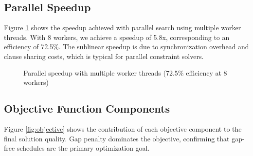 \documentclass[12pt,a4paper]{article}
\begin{document}
\subsection{Parallel Speedup}

Figure \ref{fig:parallel} shows the speedup achieved with parallel search using multiple worker threads. With 8 workers, we achieve a speedup of 5.8x, corresponding to an efficiency of 72.5\%. The sublinear speedup is due to synchronization overhead and clause sharing costs, which is typical for parallel constraint solvers.

\begin{figure}[H]
\centering
{}
\caption{Parallel speedup with multiple worker threads (72.5\% efficiency at 8 workers)}
\label{fig:parallel}
\end{figure}

\subsection{Objective Function Components}

Figure \ref{fig:objective} shows the contribution of each objective component to the final solution quality. Gap penalty dominates the objective, confirming that gap-free schedules are the primary optimization goal.
\end{document}
